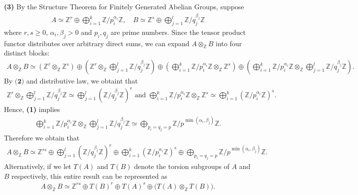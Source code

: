 \begin{solution}
    \textbf{(3)} By the Structure Theorem for Finitely Generated Abelian Groups, suppose 
    \begin{align*}
        A \simeq \mathbb{Z}^r \oplus \bigoplus_{i=1}^k \mathbb{Z}/p_i^{\alpha_i}\mathbb{Z}, \quad B \simeq \mathbb{Z}^s \oplus \bigoplus_{j=1}^l \mathbb{Z}/q_j^{\beta_j}\mathbb{Z}
    \end{align*}
    where $r, s \geq 0$, $\alpha_i,\beta_j>0$ and $p_i, q_j$ are prime numbers.
    Since the tensor product functor distributes over arbitrary direct sums, we can expand $A \otimes_{\mathbb{Z}} B$ into four distinct blocks:
    \begin{align*}
        A \otimes_{\mathbb{Z}} B \simeq (\mathbb{Z}^r \otimes_{\mathbb{Z}} \mathbb{Z}^s) \oplus \left( \mathbb{Z}^r \otimes_{\mathbb{Z}} \bigoplus_{j=1}^l \mathbb{Z}/q_j^{\beta_j}\mathbb{Z} \right) \oplus \left( \bigoplus_{i=1}^k \mathbb{Z}/p_i^{\alpha_i}\mathbb{Z} \otimes_{\mathbb{Z}} \mathbb{Z}^s \right) \oplus \left( \bigoplus_{i=1}^k \mathbb{Z}/p_i^{\alpha_i}\mathbb{Z} \otimes_{\mathbb{Z}} \bigoplus_{j=1}^l \mathbb{Z}/q_j^{\beta_j}\mathbb{Z} \right).
    \end{align*}
    By $\textbf{(2)}$ and distributive law, we obtaint that 
    \begin{align*}
        \mathbb{Z}^r \otimes_{\mathbb{Z}} \bigoplus_{j=1}^l \mathbb{Z}/q_j^{\beta_j}\mathbb{Z} \simeq \bigoplus_{j=1}^l \left(\mathbb{Z}/q_j^{\beta_j}\mathbb{Z} \right)^r\text{ and }
        \bigoplus_{i=1}^k \mathbb{Z}/p_i^{\alpha_i}\mathbb{Z} \otimes_{\mathbb{Z}} \mathbb{Z}^s \simeq \bigoplus_{i=1}^k \left(\mathbb{Z}/p_i^{\alpha_i}\mathbb{Z} \right)^s.
    \end{align*}
    Hence, \textbf{(1)} implies
    \begin{align*}
        \bigoplus_{i=1}^k \mathbb{Z}/p_i^{\alpha_i}\mathbb{Z} \otimes_{\mathbb{Z}} \bigoplus_{j=1}^l \mathbb{Z}/q_j^{\beta_j}\mathbb{Z} \simeq 
        \bigoplus_{p_i = q_j = p} \mathbb{Z}/p^{\min(\alpha_i, \beta_j)}\mathbb{Z}.
    \end{align*}
    Therefore we obtain that 
    \begin{align*}
        A \otimes_{\mathbb{Z}} B \simeq \mathbb{Z}^{rs} \oplus \bigoplus_{j=1}^l \left(\mathbb{Z}/q_j^{\beta_j}\mathbb{Z} \right)^r \oplus \bigoplus_{i=1}^k \left(\mathbb{Z}/p_i^{\alpha_i}\mathbb{Z} \right)^s
        \oplus \bigoplus_{p_i = q_j = p} \mathbb{Z}/p^{\min(\alpha_i, \beta_j)}\mathbb{Z}.
    \end{align*}
    Alternatively, if we let $T(A)$ and $T(B)$ denote the torsion subgroups of $A$ and $B$ respectively,
    this entire result can be represented as 
    \begin{align*}
        A \otimes_{\mathbb{Z}} B \simeq \mathbb{Z}^{rs} \oplus T(B)^r \oplus T(A)^s \oplus \big(T(A) \otimes_{\mathbb{Z}} T(B)\big).
    \end{align*}
\end{solution}

